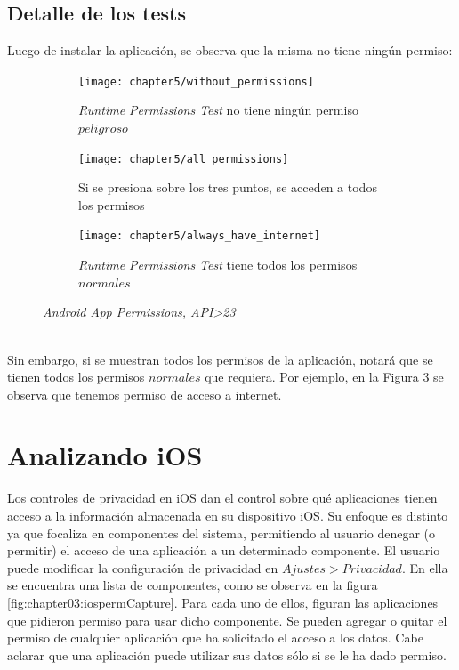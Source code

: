 \subsection*{Detalle de los tests}
Luego de instalar la aplicación, se observa que la misma no tiene ningún permiso:
\begin{figure}[!ht]
	\centering
	\begin{subfigure}{.32\textwidth}
		\texttt{[image: chapter5/without\_permissions]}
		\caption{\textit{Runtime Permissions Test} no tiene ningún permiso $peligroso$}
		\label{fig:chapter05:without_permissions}
	\end{subfigure}
	\begin{subfigure}{.32\textwidth}
		\texttt{[image: chapter5/all\_permissions]}
		\caption{Si se presiona sobre los tres puntos, se acceden a todos los permisos}
		\label{fig:chapter05:all_permissions}
	\end{subfigure}
	\begin{subfigure}{.32\textwidth}
		\texttt{[image: chapter5/always\_have\_internet]}
		\caption{\textit{Runtime Permissions Test} tiene todos los permisos $normales$}
		\label{fig:chapter05:always_have_internet}
	\end{subfigure}
	\caption{\textit{Android App Permissions, API\textgreater 23}}
	\label{fig:chapter05:android_permissions}
\end{figure}\\
Sin embargo, si se muestran todos los permisos de la aplicación, notará que se tienen todos los permisos $normales$ que requiera. Por ejemplo, en la Figura \ref{fig:chapter05:always_have_internet} se observa que tenemos permiso de acceso a internet.
    

\newpage

\section*{Analizando iOS}
Los controles de privacidad en iOS dan el control sobre qué aplicaciones tienen acceso a la información almacenada en su dispositivo iOS. Su enfoque es distinto ya que focaliza en componentes del sistema, permitiendo al usuario denegar (o permitir) el acceso de una aplicación a un determinado componente. El usuario puede modificar la configuración de privacidad en $Ajustes > Privacidad$. En ella se encuentra una lista de componentes, como se observa en la figura \ref{fig:chapter03:iospermCapture}. Para cada uno de ellos, figuran las aplicaciones que pidieron permiso para usar dicho componente. Se pueden agregar o quitar el permiso de cualquier aplicación que ha solicitado el acceso a los datos. Cabe aclarar que una aplicación puede utilizar sus datos sólo si se le ha dado permiso.\\

